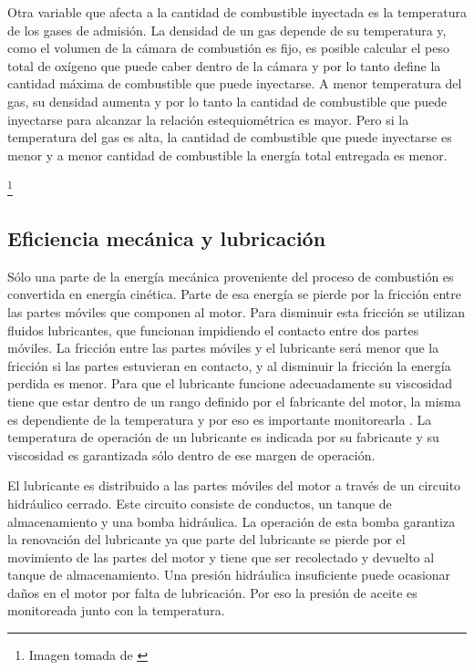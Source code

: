 Otra variable que afecta a la cantidad de combustible inyectada es la temperatura de los gases de admisión. La densidad de un gas depende de su temperatura y, como el volumen de la cámara de combustión es fijo, es posible calcular el peso total de oxígeno que puede caber dentro de la cámara y por lo tanto define la cantidad máxima de combustible que puede inyectarse. A menor temperatura del gas, su densidad aumenta y por lo tanto la cantidad de combustible que puede inyectarse para alcanzar la relación estequiométrica es mayor. Pero si la temperatura del gas es alta, la cantidad de combustible que puede inyectarse es menor y a menor cantidad de combustible la energía total entregada es menor.

\footnote[3]{Imagen tomada de \cite{motor}}

\subsection{Eficiencia mecánica y lubricación}

Sólo una parte de la energía mecánica proveniente del proceso de combustión es convertida en energía cinética. Parte de esa energía se pierde por la fricción entre las partes móviles que componen al motor. Para disminuir esta fricción se utilizan fluidos lubricantes, que funcionan impidiendo el contacto entre dos partes móviles. La fricción entre las partes móviles y el lubricante será menor que la fricción si las partes estuvieran en contacto, y al disminuir la fricción la energía perdida es menor. Para que el lubricante funcione adecuadamente su viscosidad tiene que estar dentro de un rango definido por el fabricante del motor, la misma es dependiente de la temperatura y por eso es importante monitorearla \cite{lubrication}. La temperatura de operación de un lubricante es indicada por su fabricante y su viscosidad es garantizada sólo dentro de ese margen de operación.

El lubricante es distribuido a las partes móviles del motor a través de un circuito hidráulico cerrado. Este circuito consiste de conductos, un tanque de almacenamiento y una bomba hidráulica. La operación de esta bomba garantiza la renovación del lubricante ya que parte del lubricante se pierde por el movimiento de las partes del motor y tiene que ser recolectado y devuelto al tanque de almacenamiento. Una presión hidráulica insuficiente puede ocasionar daños en el motor por falta de lubricación. Por eso la presión de aceite es monitoreada junto con la temperatura.

